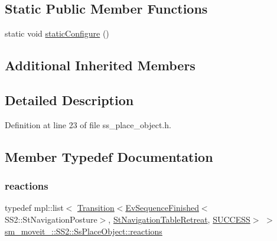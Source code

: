 \subsection*{Static Public Member Functions}
\begin{DoxyCompactItemize}
\item 
static void \hyperlink{structsm__moveit__4_1_1SS2_1_1SsPlaceObject_ad5e0cd7fc79448446fcfa5a1b3a5a35d}{static\+Configure} ()
\end{DoxyCompactItemize}
\subsection*{Additional Inherited Members}


\subsection{Detailed Description}


Definition at line 23 of file ss\+\_\+place\+\_\+object.\+h.



\subsection{Member Typedef Documentation}
\mbox{\label{structsm__moveit__4_1_1SS2_1_1SsPlaceObject_a51693005763762aec9f908f0a624ee87}} 
\subsubsection{\texorpdfstring{reactions}{reactions}}
{\footnotesize\ttfamily typedef mpl\+::list$<$ \hyperlink{classsmacc_1_1Transition}{Transition}$<$\hyperlink{structsmacc_1_1default__events_1_1EvSequenceFinished}{Ev\+Sequence\+Finished}$<$S\+S2\+::\+St\+Navigation\+Posture$>$, \hyperlink{structsm__moveit__4_1_1StNavigationTableRetreat}{St\+Navigation\+Table\+Retreat}, \hyperlink{structsmacc_1_1default__transition__tags_1_1SUCCESS}{S\+U\+C\+C\+E\+SS}$>$ $>$ \hyperlink{structsm__moveit__4_1_1SS2_1_1SsPlaceObject_a51693005763762aec9f908f0a624ee87}{sm\+\_\+moveit\+\_\+::\+S\+S2\+::\+Ss\+Place\+Object\+::reactions}}



